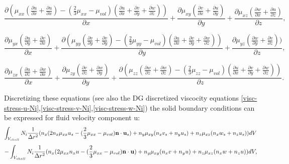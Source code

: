 \begin{equation}
\frac{\partial ( \mu_{xx}
(
\frac{\partial u}{\partial x}+\frac{\partial u}{\partial x})
-(\frac{2}{3}\mu_{xx}-\mu_{vol})(\frac{\partial u}{\partial x}+\frac{\partial v}{\partial y}+\frac{\partial w}{\partial z})
)}
{\partial x}
+
\frac{\partial \mu_{xy}
(
\frac{\partial v}{\partial x}+\frac{\partial u}{\partial y})
}
{\partial y}
+
\frac{\partial \mu_{xz}
(
\frac{\partial w}{\partial x}+\frac{\partial u}{\partial z})
}
{\partial z}, 
\label{visc-stress-u-2} 
\end{equation}



\begin{equation}
\frac{\partial \mu_{yx}
(
\frac{\partial u}{\partial y}+\frac{\partial v}{\partial x}
)}
{\partial x}
+
\frac{\partial (\mu_{yy}
(
\frac{\partial v}{\partial y}+\frac{\partial v}{\partial y})
-(\frac{2}{3}\mu_{yy}-\mu_{vol})(\frac{\partial u}{\partial x}+\frac{\partial v}{\partial y}+\frac{\partial w}{\partial z})
)}
{\partial y}
+
\frac{\partial \mu_{yz}
(
\frac{\partial w}{\partial y}+\frac{\partial v}{\partial z})
)}
{\partial z}, 
\label{visc-stress-v-2} 
\end{equation}



\begin{equation}
\frac{\partial \mu_{zx}
(
\frac{\partial u}{\partial z}+\frac{\partial w}{\partial x})
}
{\partial x}
+
\frac{\partial \mu_{zy}
(
\frac{\partial v}{\partial z}+\frac{\partial w}{\partial y})
}
{\partial y}
+
\frac{\partial ( \mu_{zz}
(
\frac{\partial w}{\partial z}+\frac{\partial w}{\partial z})
-(\frac{2}{3}\mu_{zz}-\mu_{vol})(\frac{\partial u}{\partial x}+\frac{\partial v}{\partial y}+\frac{\partial w}{\partial z})
)}
{\partial z}. 
\label{visc-stress-w-2} 
\end{equation}


Discretizing these equations (see also the DG discretized viscocity equations \ref{visc-stress-u-Ni},\ref{visc-stress-v-Ni},\ref{visc-stress-w-Ni}) the solid boundary conditions can be expressed  
for fluid velocity component u:
\begin{equation}
\int_{V_{shell}} 
N_i \frac{1}{\Delta r^2} 
({n_x} 
(
2 n_x \mu_{xx}u_s 
-(\frac{2}{3} \mu_{xx}-\mu_{vol}){\bf n}\cdot{\bf u}_s 
)
+
 {n_y} \mu_{xy}
( n_x  v_s + n_y u_s) 
+
{n_z} \mu_{xz}
( n_x w_s + n_z u_s ) 
 )d V
\label{visc-stress-u-n-2-solid} 
\end{equation}
\begin{equation}
- \int_{V_{shell}} 
N_i\frac{1}{\Delta r^2} ({n_x}   (2\mu_{xx}
n_x u 
-(\frac{2}{3}\mu_{xx}-\mu_{vol}) {\bf n}\cdot{\bf u} 
)
+
 {n_y} \mu_{xy}
( n_x  v + n_y u) 
+
{n_z} \mu_{xz}
( n_x w + n_z u ) 
 )d V,
\label{visc-stress-u-n-2-fluid} 
\end{equation}


